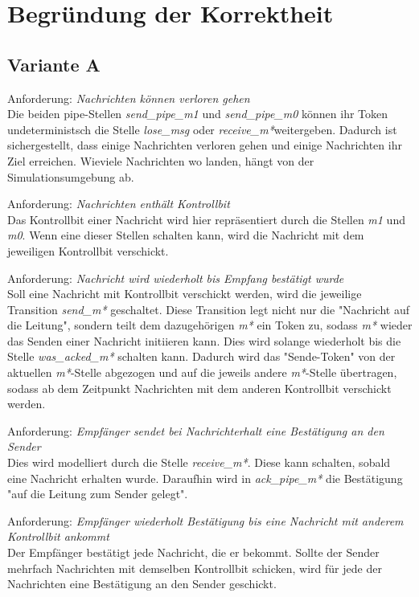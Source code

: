 \documentclass[]{scrartcl}
\begin{document}
\section{Begründung der Korrektheit}
\subsection{Variante A}
Anforderung: \textit{Nachrichten können verloren gehen} \\
Die beiden pipe-Stellen \textit{send\_pipe\_m1} und \textit{send\_pipe\_m0} können ihr Token undeterministsch die Stelle \textit{lose\_msg} oder \textit{receive\_m*}weitergeben. Dadurch ist sichergestellt, dass einige Nachrichten verloren gehen und einige Nachrichten ihr Ziel erreichen. Wieviele Nachrichten wo landen, hängt von der Simulationsumgebung ab.

Anforderung: \textit{Nachrichten enthält Kontrollbit} \\
Das Kontrollbit einer Nachricht wird hier repräsentiert durch die Stellen \textit{m1} und \textit{m0}. Wenn eine dieser Stellen schalten kann, wird die Nachricht mit dem jeweiligen Kontrollbit verschickt.

Anforderung: \textit{Nachricht wird wiederholt bis Empfang bestätigt wurde} \\
Soll eine Nachricht mit Kontrollbit verschickt werden, wird die jeweilige Transition \textit{send\_m*} geschaltet. Diese Transition legt nicht nur die "Nachricht auf die Leitung", sondern teilt dem dazugehörigen \textit{m*} ein Token zu, sodass \textit{m*} wieder das Senden einer Nachricht initiieren kann. Dies wird solange wiederholt bis die Stelle \textit{was\_acked\_m*} schalten kann. Dadurch wird das "Sende-Token" von der aktuellen \textit{m*}-Stelle abgezogen und auf die jeweils andere \textit{m*}-Stelle übertragen, sodass ab dem Zeitpunkt Nachrichten mit dem anderen Kontrollbit verschickt werden.

Anforderung: \textit{Empfänger sendet bei Nachrichterhalt eine Bestätigung an den Sender} \\
Dies wird modelliert durch die Stelle \textit{receive\_m*}. Diese kann schalten, sobald eine Nachricht erhalten wurde. Daraufhin wird in \textit{ack\_pipe\_m*} die Bestätigung "auf die Leitung zum Sender gelegt".

Anforderung: \textit{Empfänger wiederholt Bestätigung bis eine Nachricht mit anderem Kontrollbit ankommt} \\
Der Empfänger bestätigt jede Nachricht, die er bekommt. Sollte der Sender mehrfach Nachrichten mit demselben Kontrollbit schicken, wird für jede der Nachrichten eine Bestätigung an den Sender geschickt.
\end{document}
